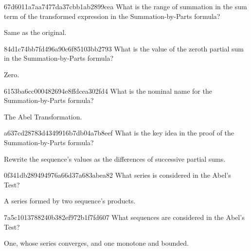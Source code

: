 \begin{note}{67d6011a7aa7477da37cbb1ab2899cea}
    What is the range of summation in the sum term of the transformed expression in the Summation-by-Parts formula?

    \begin{cloze}{1}
        Same as the original.
    \end{cloze}
\end{note}

\begin{note}{84d1c74bb7fd496a90c6f85103bb2793}
    What is the value of the zeroth partial sum in the Summation-by-Parts formula?

    \begin{cloze}{1}
        Zero.
    \end{cloze}
\end{note}

\begin{note}{6153ba6cc000482694e8ffdcea302fd4}
    What is the nominal name for the Summation-by-Parts formula?

    \begin{cloze}{1}
        The Abel Transformation.
    \end{cloze}
\end{note}

\begin{note}{a637cd28783d4349916b7db04a7b8eef}
    What is the key idea in the proof of the Summation-by-Parts formula?

    \begin{cloze}{1}
        Rewrite the sequence's values as the differences of successive partial sums.
    \end{cloze}
\end{note}

\begin{note}{0f341db289494976a66d37a683abea82}
    What series is considered in the Abel's Test?

    \begin{cloze}{1}
        A series formed by two sequence's products.
    \end{cloze}
\end{note}

\begin{note}{7a5c1013788240b382ef972b1f7fd607}
    What sequences are considered in the Abel's Test?

    \begin{cloze}{1}
        One, whose series converges, and one monotone and bounded.
    \end{cloze}
\end{note}

